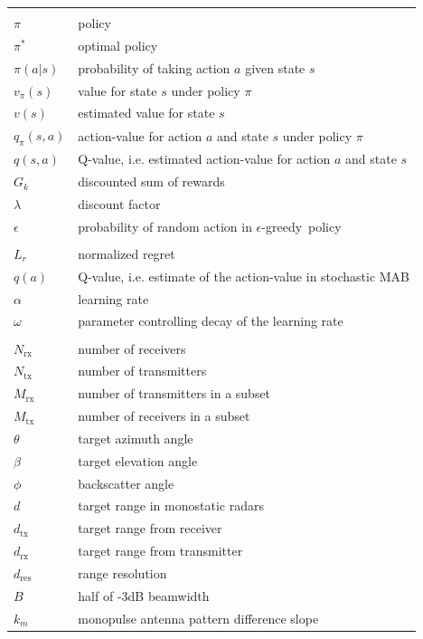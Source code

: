 \documentclass[english, 12pt, a4paper, elec, utf8, a-1b, online]{aaltothesis}
\newcommand{\egreedy}{$\epsilon$-greedy~}
\newcommand{\regret}{L_r}
\begin{document}
\begin{longtable}{ll}
&\\
$\pi$ & policy \\
$\pi^*$ & optimal policy \\
$\pi(a|s)$ & probability of taking action $a$ given state $s$ \\
$v_\pi(s)$ & value for state $s$ under policy $\pi$ \\
$v(s)$ & estimated value for state $s$ \\
$q_\pi(s, a)$ & action-value for action $a$ and state $s$ under policy $\pi$ \\
$q(s, a)$ &  Q-value, i.e. estimated action-value for action $a$ and state $s$ \\
$G_k$ & discounted sum of rewards \\
$\lambda$ & discount factor \\
$\epsilon$ & probability of random action in \egreedy policy \\
&\\
$\regret$ & normalized regret \\
$q(a)$ & Q-value, i.e. estimate of the action-value in stochastic MAB \\
$\alpha$ & learning rate \\
$\omega$ & parameter controlling decay of the learning rate \\ 
&\\
$N_\text{rx}$ & number of receivers \\
$N_\text{tx}$ & number of transmitters \\
$M_\text{rx}$ & number of transmitters in a subset \\
$M_\text{tx}$ & number of receivers in a subset \\
$\theta$ & target azimuth angle \\
$\beta$ & target elevation angle \\
$\phi$ & backscatter angle \\
$d$ & target range in monostatic radars \\
$d_\text{tx}$ & target range from receiver \\
$d_\text{rx}$ & target range from transmitter \\
$d_\text{res}$ & range resolution \\
$B$ & half of -3dB beamwidth \\
$k_m$ & monopulse antenna pattern difference slope \\

\end{longtable}
\end{document}
